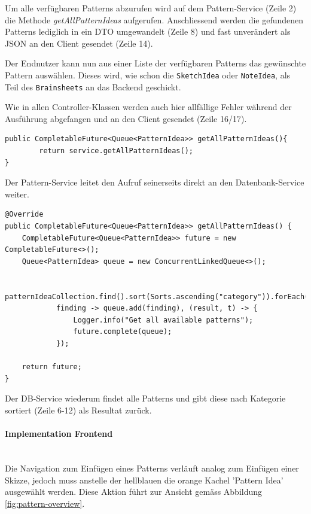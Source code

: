 Um alle verfügbaren Patterns abzurufen wird auf dem Pattern-Service (Zeile 2) die Methode \textit{getAllPatternIdeas} aufgerufen. Anschliessend werden die gefundenen Patterns lediglich in ein DTO umgewandelt (Zeile 8) und fast unverändert als JSON an den Client gesendet (Zeile 14).

Der Endnutzer kann nun aus einer Liste der verfügbaren Patterns das gewünschte Pattern auswählen. Dieses wird, wie schon die \texttt{SketchIdea} oder \texttt{NoteIdea}, als Teil des \texttt{Brainsheets} an das Backend geschickt. 

Wie in allen Controller-Klassen werden auch hier allfällige Fehler während der Ausführung abgefangen und an den Client gesendet (Zeile 16/17).

\begin{lstlisting}[caption={Alle Pattern holen im Pattern Service}, label=getAllPatternInService]
public CompletableFuture<Queue<PatternIdea>> getAllPatternIdeas(){
        return service.getAllPatternIdeas();
}
\end{lstlisting}

Der Pattern-Service leitet den Aufruf seinerseits direkt an den Datenbank-Service weiter.

\begin{lstlisting}[caption={Alle Pattern holen im Pattern DB Service}, label=getAllPatternInDBService]
@Override
public CompletableFuture<Queue<PatternIdea>> getAllPatternIdeas() {
    CompletableFuture<Queue<PatternIdea>> future = new CompletableFuture<>();
    Queue<PatternIdea> queue = new ConcurrentLinkedQueue<>();

    patternIdeaCollection.find().sort(Sorts.ascending("category")).forEach(
            finding -> queue.add(finding), (result, t) -> {
                Logger.info("Get all available patterns");
                future.complete(queue);
            });

    return future;
}
\end{lstlisting}

Der DB-Service wiederum findet alle Patterns und gibt diese nach Kategorie sortiert (Zeile 6-12) als Resultat zurück.

\paragraph*{Implementation Frontend}~\\

Die Navigation zum Einfügen eines Patterns verläuft analog zum Einfügen einer Skizze, jedoch muss anstelle der hellblauen die orange Kachel 'Pattern Idea' ausgewählt werden. Diese Aktion führt zur Ansicht gemäss Abbildung \ref{fig:pattern-overview}.

